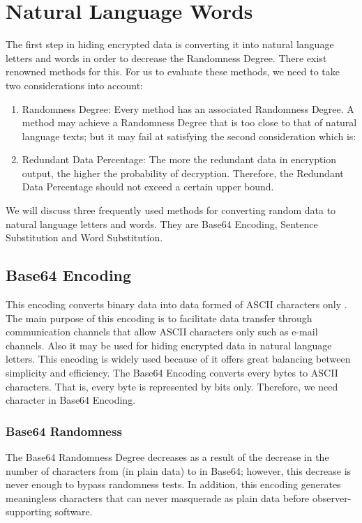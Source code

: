 \documentclass{acm_proc_article-sp}
\begin{document}
\section{Natural Language Words}\label{Natural-Language-Words}
The first step in hiding encrypted data is converting it into natural language letters and words in order to decrease the Randomness Degree. There exist renowned methods for this. For us to evaluate these methods, we need to take two considerations into account:
\begin{enumerate}
  \item Randomness Degree: Every method has an associated Randomness Degree. A method may achieve a Randomness Degree that is too close to that of natural language texts; but it may fail at satisfying the second consideration which is:
  \item Redundant Data Percentage: The more the redundant data in encryption output, the higher the probability of decryption. Therefore, the Redundant Data Percentage should not exceed a certain upper bound.
\end{enumerate}
We will discuss three frequently used methods for converting random data to natural language letters and words. They are Base64 Encoding, Sentence Substitution and Word Substitution.

\subsection{Base64 Encoding}\label{Base64-Encoding}
This encoding converts binary data into data formed of ASCII characters only \cite{RFC}. The main purpose of this encoding is to facilitate data transfer through communication channels that allow ASCII characters only such as e-mail channels. Also it may be used for hiding encrypted data in natural language letters. This encoding is widely used because of it offers great balancing between simplicity and efficiency. The Base64 Encoding converts every  bytes to  ASCII characters. That is, every byte is represented by  bits only. Therefore, we need  character in Base64 Encoding.

\subsubsection{Base64 Randomness}\label{Base64-Randomness}
The Base64 Randomness Degree decreases as a result of the decrease in the number of characters from  (in plain data) to  in Base64; however, this decrease is never enough to bypass randomness tests. In addition, this encoding generates meaningless characters that can never masquerade as plain data before observer-supporting software.
\end{document}
